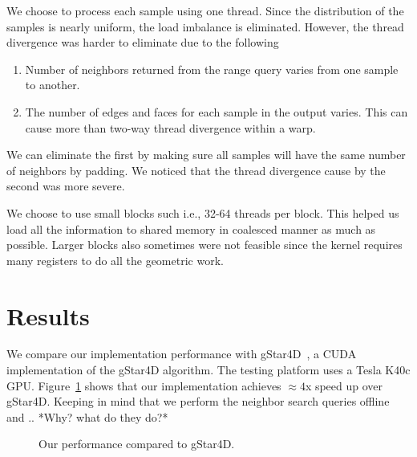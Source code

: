 \documentclass[12pt] {article}
\begin{document}
We choose to process each sample using one thread. Since the distribution of the samples is nearly uniform, the load imbalance is eliminated. However, the thread divergence was harder to eliminate due to the following 
\begin{enumerate}
\item Number of neighbors returned from the range query varies from one sample to another. 
\item The number of edges and faces for each sample in the output varies. This can cause more than two-way thread divergence within a warp. 
\end{enumerate}

We can eliminate the first by making sure all samples will have the same number of neighbors by padding. We noticed that the thread divergence cause by the second was more severe. 

We choose to use small blocks such i.e., 32-64 threads per block. This helped us load all the information to shared memory in coalesced manner as much as possible. Larger blocks also sometimes were not feasible since the kernel requires many registers to do all the geometric work. 

\section*{Results}

We compare our implementation performance with gStar4D~\citep{Ashwin2012GPUDelaunay}, a CUDA implementation of the gStar4D algorithm. The testing platform uses a Tesla K40c GPU. Figure~\ref{fig:timing} shows that our implementation achieves $\approx4$x speed up over gStar4D. Keeping in mind that we perform the neighbor search queries offline and .. *Why? what do they do?*

\begin{figure}[!tbh]
\centering        
   \caption{Our performance compared to gStar4D.}
   \label{fig:timing}
\end{figure}


\end{document}
